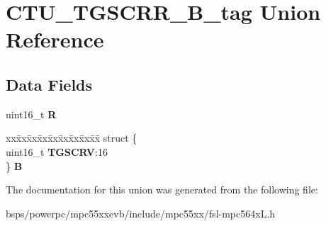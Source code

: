 \hypertarget{unionCTU__TGSCRR__16B__tag}{}\section{C\+T\+U\+\_\+\+T\+G\+S\+C\+R\+R\+\_\+B\+\_\+tag Union Reference}
\label{unionCTU__TGSCRR__16B__tag}
\subsection*{Data Fields}
\begin{DoxyCompactItemize}
\item 
\mbox{\label{unionCTU__TGSCRR__16B__tag_aef892c005af18110210c8fd83df2b3f9}} 
uint16\+\_\+t {\bfseries R}
\item 
\mbox{\label{unionCTU__TGSCRR__16B__tag_ac0d5ce51981eb0a6eceeedf1b561c5a2}} 
\begin{tabbing}
xx\=xx\=xx\=xx\=xx\=xx\=xx\=xx\=xx\=\kill
struct \{\\
\>uint16\_t {\bfseries TGSCRV}:16\\
\} {\bfseries B}\\

\end{tabbing}\end{DoxyCompactItemize}


The documentation for this union was generated from the following file\+:\begin{DoxyCompactItemize}
\item 
bsps/powerpc/mpc55xxevb/include/mpc55xx/fsl-\/mpc564x\+L.\+h\end{DoxyCompactItemize}
